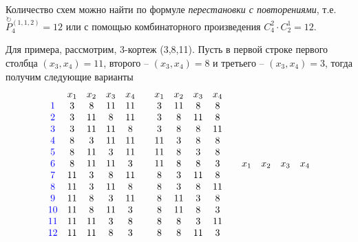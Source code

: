 \documentclass[%
	11pt,
	a4paper,
	utf8,
		]{article}
\begin{document}
Количество схем можно найти по формуле \emph{перестановки с повторениями}, т.е. $ \stackrel{\circlearrowright}{P}{}_4^{(1,1,2)} = 12 $ или с помощью комбинаторного произведения $ C_4^2 \cdot C_2^1 = 12 $.

Для примера, рассмотрим, 3-кортеж (3,8,11). Пусть в первой строке первого столбца $ (x_3, x_4) = 11 $, второго -- $ (x_3, x_4) = 8 $ и третьего -- $ (x_3, x_4) = 3 $, тогда получим следующие варианты
\begin{align*}
	\begin{matrix}
		{} & x_1 & x_2 & x_3 & x_4 \\
		{\color{blue}1} & 3 & 8 & 11 & 11 \\
		{\color{blue}2} & 3 & 11 & 8 & 11 \\
		{\color{blue}3} & 3 & 11 & 11 & 8 \\
		{\color{blue}4} & 8 & 3 & 11 & 11 \\
		{\color{blue}5} & 8 & 11 & 3 & 11 \\
		{\color{blue}6} & 8 & 11 & 11 & 3 \\
		{\color{blue}7} & 11 & 3 & 8 & 11 \\
		{\color{blue}8} & 11 &  3 & 11 & 8 \\
		{\color{blue}9} & 11 & 8 & 3 & 11 \\
		{\color{blue}10} & 11 & 8 & 11 & 3 \\
		{\color{blue}11} & 11 & 11 & 3 & 8 \\
		{\color{blue}12} & 11 & 11 & 8 & 3
	\end{matrix}
    \qquad
	\begin{matrix}
		x_1 & x_2 & x_3 & x_4 \\
		3 & 11 & 8 & 8 \\
		3 & 8 & 11 & 8 \\
		3 & 8 & 8 &11 \\
		11 & 3 & 8 & 8 \\
		11 & 8 & 3 & 8 \\
		11 & 8 & 8 & 3 \\
		8 & 3 & 11 & 8 \\
		8 & 3 & 8 & 11 \\
		8 & 11 & 3 & 8 \\
		8 & 11 & 8 & 3 \\
		8 & 8 & 3 & 11 \\
		8 & 8 & 11 & 3 \\
	\end{matrix}
    \qquad
    \begin{matrix}
    	x_1 & x_2 & x_3 & x_4 \\

\end{matrix}
\end{align*}
\end{document}
